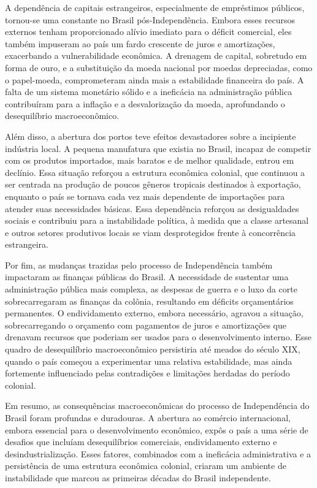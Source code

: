\documentclass[a4paper,12pt]{article}[abntex2]
\begin{document}
A dependência de capitais estrangeiros, especialmente de empréstimos públicos, tornou-se uma constante no Brasil pós-Independência. Embora esses recursos externos tenham proporcionado alívio imediato para o déficit comercial, eles também impuseram ao país um fardo crescente de juros e amortizações, exacerbando a vulnerabilidade econômica. A drenagem de capital, sobretudo em forma de ouro, e a substituição da moeda nacional por moedas depreciadas, como o papel-moeda, comprometeram ainda mais a estabilidade financeira do país. A falta de um sistema monetário sólido e a ineficácia na administração pública contribuíram para a inflação e a desvalorização da moeda, aprofundando o desequilíbrio macroeconômico.

Além disso, a abertura dos portos teve efeitos devastadores sobre a incipiente indústria local. A pequena manufatura que existia no Brasil, incapaz de competir com os produtos importados, mais baratos e de melhor qualidade, entrou em declínio. Essa situação reforçou a estrutura econômica colonial, que continuou a ser centrada na produção de poucos gêneros tropicais destinados à exportação, enquanto o país se tornava cada vez mais dependente de importações para atender suas necessidades básicas. Essa dependência reforçou as desigualdades sociais e contribuiu para a instabilidade política, à medida que a classe artesanal e outros setores produtivos locais se viam desprotegidos frente à concorrência estrangeira.

Por fim, as mudanças trazidas pelo processo de Independência também impactaram as finanças públicas do Brasil. A necessidade de sustentar uma administração pública mais complexa, as despesas de guerra e o luxo da corte sobrecarregaram as finanças da colônia, resultando em déficits orçamentários permanentes. O endividamento externo, embora necessário, agravou a situação, sobrecarregando o orçamento com pagamentos de juros e amortizações que drenavam recursos que poderiam ser usados para o desenvolvimento interno. Esse quadro de desequilíbrio macroeconômico persistiria até meados do século XIX, quando o país começou a experimentar uma relativa estabilidade, mas ainda fortemente influenciado pelas contradições e limitações herdadas do período colonial.

Em resumo, as consequências macroeconômicas do processo de Independência do Brasil foram profundas e duradouras. A abertura ao comércio internacional, embora essencial para o desenvolvimento econômico, expôs o país a uma série de desafios que incluíam desequilíbrios comerciais, endividamento externo e desindustrialização. Esses fatores, combinados com a ineficácia administrativa e a persistência de uma estrutura econômica colonial, criaram um ambiente de instabilidade que marcou as primeiras décadas do Brasil independente.
\end{document}

